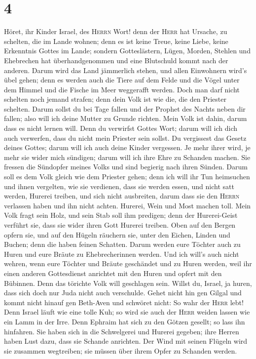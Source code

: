 \hypertarget{section-3}{%
\section{4}\label{section-3}}

 Höret, ihr Kinder Israel, des \textsc{Herrn} Wort! denn
der \textsc{Herr} hat Ursache, zu schelten, die im Lande wohnen; denn es
ist keine Treue, keine Liebe, keine Erkenntnis Gottes im Lande;
 sondern Gotteslästern, Lügen, Morden, Stehlen und
Ehebrechen hat überhandgenommen und eine Blutschuld kommt nach der
anderen.  Darum wird das Land jämmerlich stehen, und allen
Einwohnern wird's übel gehen; denn es werden auch die Tiere auf dem
Felde und die Vögel unter dem Himmel und die Fische im Meer weggerafft
werden.  Doch man darf nicht schelten noch jemand strafen;
denn dein Volk ist wie die, die den Priester schelten. 
Darum sollst du bei Tage fallen und der Prophet des Nachts neben dir
fallen; also will ich deine Mutter zu Grunde richten. 
Mein Volk ist dahin, darum dass es nicht lernen will. Denn du verwirfst
Gottes Wort; darum will ich dich auch verwerfen, dass du nicht mein
Priester sein sollst. Du vergissest das Gesetz deines Gottes; darum will
ich auch deine Kinder vergessen.  Je mehr ihrer wird, je
mehr sie wider mich sündigen; darum will ich ihre Ehre zu Schanden
machen.  Sie fressen die Sündopfer meines Volks und sind
begierig nach ihren Sünden.  Darum soll es dem Volk gleich
wie dem Priester gehen; denn ich will ihr Tun heimsuchen und ihnen
vergelten, wie sie verdienen,  dass sie werden essen, und
nicht satt werden, Hurerei treiben, und sich nicht ausbreiten, darum
dass sie den \textsc{Herrn} verlassen haben und ihn nicht achten.
 Hurerei, Wein und Most machen toll.  Mein
Volk fragt sein Holz, und sein Stab soll ihm predigen; denn der
Hurerei-Geist verführt sie, dass sie wider ihren Gott Hurerei treiben.
 Oben auf den Bergen opfern sie, und auf den Hügeln
räuchern sie, unter den Eichen, Linden und Buchen; denn die haben feinen
Schatten. Darum werden eure Töchter auch zu Huren und eure Bräute zu
Ehebrecherinnen werden.  Und ich will's auch nicht
wehren, wenn eure Töchter und Bräute geschändet und zu Huren werden,
weil ihr einen anderen Gottesdienst anrichtet mit den Huren und opfert
mit den Bübinnen. Denn das törichte Volk will geschlagen sein.
 Willst du, Israel, ja huren, dass sich doch nur Juda
nicht auch verschulde. Gehet nicht hin gen Gilgal und kommt nicht hinauf
gen Beth-Aven und schwöret nicht: So wahr der \textsc{Herr} lebt!
 Denn Israel läuft wie eine tolle Kuh; so wird sie auch
der \textsc{Herr} weiden lassen wie ein Lamm in der Irre.
 Denn Ephraim hat sich zu den Götzen gesellt; so lass ihn
hinfahren.  Sie haben sich in die Schwelgerei und Hurerei
gegeben; ihre Herren haben Lust dazu, dass sie Schande anrichten.
 Der Wind mit seinen Flügeln wird sie zusammen
wegtreiben; sie müssen über ihrem Opfer zu Schanden werden.

